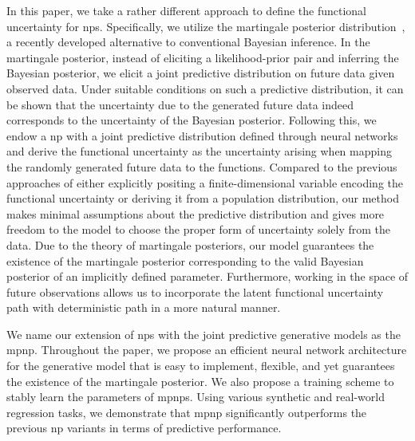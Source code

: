 In this paper, we take a rather different approach to define the functional uncertainty for \glspl{np}. Specifically, we utilize the martingale posterior distribution~\citep{fong2021martingale}, a recently developed alternative to conventional Bayesian inference. In the martingale posterior, instead of eliciting a likelihood-prior pair and inferring the Bayesian posterior, we elicit a joint predictive distribution on future data given observed data. Under suitable conditions on such a predictive distribution, it can be shown that the uncertainty due to the generated future data indeed corresponds to the uncertainty of the Bayesian posterior. Following this, we endow a \gls{np} with a joint predictive distribution defined through neural networks and derive the functional uncertainty as the uncertainty arising when mapping the randomly generated future data to the functions. Compared to the previous approaches of either explicitly positing a finite-dimensional variable encoding the functional uncertainty or deriving it from a population distribution, our method makes minimal assumptions about the predictive distribution and gives more freedom to the model to choose the proper form of uncertainty solely from the data. Due to the theory of martingale posteriors, our model guarantees the existence of the martingale posterior corresponding to the valid Bayesian posterior of an implicitly defined parameter. 
Furthermore, working in the space of future observations allows us to incorporate the latent functional uncertainty path with deterministic path in a more natural manner.

We name our extension of \glspl{np} with the joint predictive generative models as the \gls{mpnp}. Throughout the paper, we propose an efficient neural network architecture for the generative model that is easy to implement, flexible, and yet guarantees the existence of the martingale posterior. We also propose a training scheme to stably learn the parameters of \glspl{mpnp}. Using various synthetic and real-world regression tasks, we demonstrate that \gls{mpnp} significantly outperforms the previous \gls{np} variants in terms of predictive performance.





